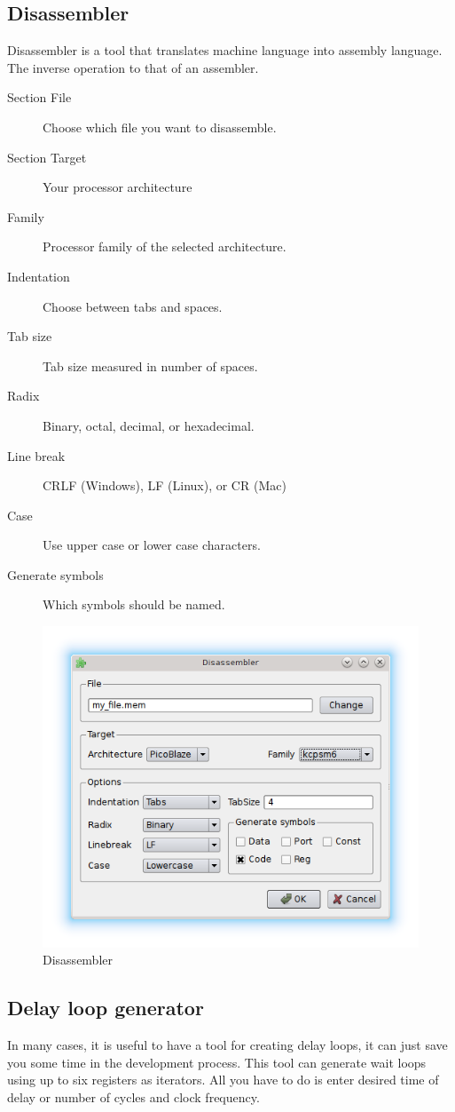 \subsection{Disassembler}
    Disassembler is a tool that translates machine language into assembly language. The inverse
    operation to that of an assembler.

    \begin{description}
        \item[Section File] Choose which file you want to disassemble.
        \item[Section Target] Your processor architecture
        \item[Family] Processor family of the selected architecture.
        \item[Indentation] Choose between tabs and spaces.
        \item[Tab size] Tab size measured in number of spaces.
        \item[Radix] Binary, octal, decimal, or hexadecimal.
        \item[Line break] CRLF (Windows), LF (Linux), or CR (Mac)
        \item[Case] Use upper case or lower case characters.
        \item[Generate symbols] Which symbols should be named.
    \end{description}

    \begin{figure}[h]
        \centering
        \includegraphics[width=.5\textwidth]{img/disassembler_window.png}
        \caption{Disassembler}
    \end{figure}

\subsection{Delay loop generator}
    In many cases, it is useful to have a tool for creating delay loops, it can just save you some time in the
    development process. This tool can generate wait loops using up to six registers as iterators. All you have to do is
    enter desired time of delay or number of cycles and clock frequency.

